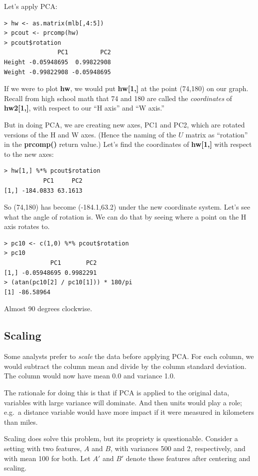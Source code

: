 Let's apply PCA:

\begin{lstlisting}
> hw <- as.matrix(mlb[,4:5]) 
> pcout <- prcomp(hw) 
> pcout$rotation 
               PC1         PC2
Height -0.05948695  0.99822908
Weight -0.99822908 -0.05948695
\end{lstlisting}

If we were to plot \textbf{hw}, we would put \textbf{hw[1,]} at the
point (74,180) on our graph.  Recall from high school math that 74 and
180 are called the \textit{coordinates} of \textbf{hw2[1,]}, with
respect to our ``H axis'' and ``W axis.''

But in doing PCA, we are creating new axes, PC1 and PC2, which are
rotated versions of the H and W axes.  (Hence the naming of the $U$
matrix as ``rotation'' in the \textbf{prcomp()} return value.)  Let's
find the coordinates of \textbf{hw[1,]} with respect to the new axes:

\begin{lstlisting}
> hw[1,] %*% pcout$rotation
           PC1     PC2
[1,] -184.0833 63.1613
\end{lstlisting}

So (74,180) has become (-184.1,63.2) under the new coordinate
system.  Let's see what the angle of rotation is. We can do that by
seeing where a point on the H axis rotates to.

\begin{lstlisting}
> pc10 <- c(1,0) %*% pcout$rotation
> pc10
             PC1       PC2
[1,] -0.05948695 0.9982291
> (atan(pc10[2] / pc10[1])) * 180/pi
[1] -86.58964
\end{lstlisting}

Almost 90 degrees clockwise.

\subsection{Scaling}

Some analysts prefer to \textit{scale} the data before applying PCA.
For each column, we would subtract the column mean and divide by the
column standard deviation.  The column would now have mean 0.0 and
variance 1.0.

The rationale for doing this is that if PCA is applied to the original
data, variables with large variance will dominate.  And then units would
play a role; e.g.\ a distance variable would have more impact if it were
measured in kilometers than miles.

Scaling does solve this problem, but its propriety is questionable.
Consider a setting with two features, $A$ and $B$, with variances 500
and 2, respectively, and with mean 100 for both.  Let $A'$ and $B'$
denote these features after centering and scaling.

